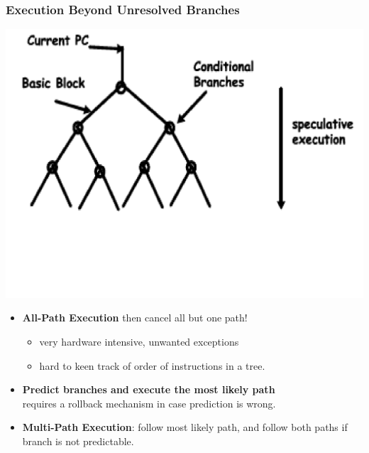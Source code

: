 \documentclass{beamer}
\newcommand{\emp}[1]{\textcolor{DikuRed}{ #1}}
\begin{document}
\begin{frame}[fragile,t]
\frametitle{Execution Beyond Unresolved Branches}

\includegraphics[width=44ex]{FigsOoOProc/CondBranch.pdf}
\vspace{-11ex}


\begin{itemize}
    \item \emp{\bf All-Path Execution} then cancel all but one path!
        \begin{itemize}
            \item very hardware intensive, unwanted exceptions
            \item hard to keen track of order of instructions in a tree.
        \end{itemize}\smallskip 
    \item \emp{\bf Predict branches and execute the most likely path}\\
            requires a rollback mechanism in case prediction is wrong.\medskip
    \item \emp{\bf Multi-Path Execution}: follow most likely path,
            and follow both paths if branch is not predictable.
\end{itemize}
\end{frame}
\end{document}
